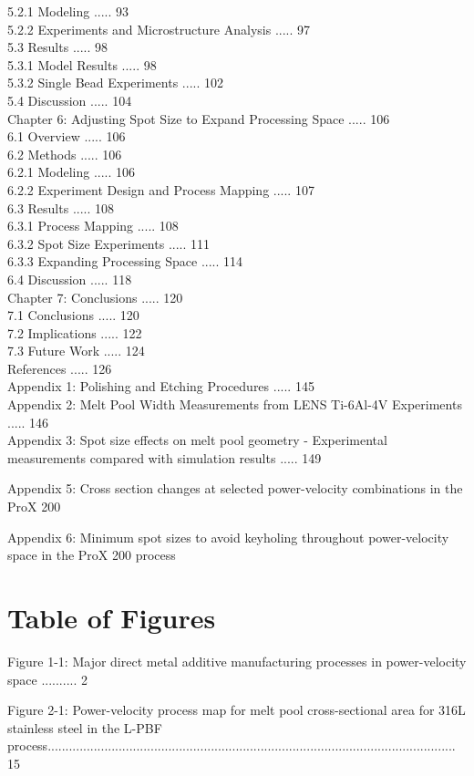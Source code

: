 \documentclass[10pt]{article}
\begin{document}
5.2.1 Modeling ..... 93\\
5.2.2 Experiments and Microstructure Analysis ..... 97\\
5.3 Results ..... 98\\
5.3.1 Model Results ..... 98\\
5.3.2 Single Bead Experiments ..... 102\\
5.4 Discussion ..... 104\\
Chapter 6: Adjusting Spot Size to Expand Processing Space ..... 106\\
6.1 Overview ..... 106\\
6.2 Methods ..... 106\\
6.2.1 Modeling ..... 106\\
6.2.2 Experiment Design and Process Mapping ..... 107\\
6.3 Results ..... 108\\
6.3.1 Process Mapping ..... 108\\
6.3.2 Spot Size Experiments ..... 111\\
6.3.3 Expanding Processing Space ..... 114\\
6.4 Discussion ..... 118\\
Chapter 7: Conclusions ..... 120\\
7.1 Conclusions ..... 120\\
7.2 Implications ..... 122\\
7.3 Future Work ..... 124\\
References ..... 126\\
Appendix 1: Polishing and Etching Procedures ..... 145\\
Appendix 2: Melt Pool Width Measurements from LENS Ti-6Al-4V Experiments ..... 146\\
Appendix 3: Spot size effects on melt pool geometry - Experimental measurements compared with simulation results ..... 149

Appendix 5: Cross section changes at selected power-velocity combinations in the ProX 200

Appendix 6: Minimum spot sizes to avoid keyholing throughout power-velocity space in the ProX 200 process

\section*{Table of Figures}
Figure 1-1: Major direct metal additive manufacturing processes in power-velocity space .......... 2

Figure 2-1: Power-velocity process map for melt pool cross-sectional area for 316L stainless steel in the L-PBF process................................................................................................................... 15
\end{document}
